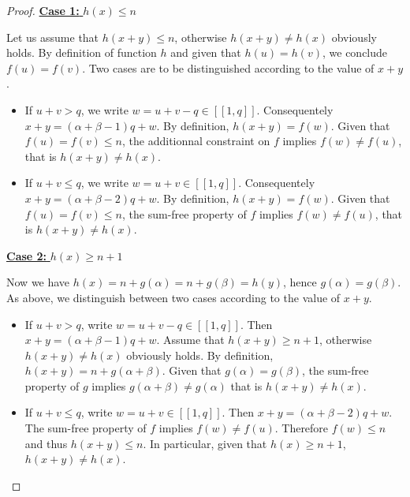 \documentclass[final,onefignum,onetabnum]{siamart190516}
\begin{document}
\begin{proof}
	\noindent \underline{\textbf{Case 1:} \(h(x) \leqslant n\)}
	\par
	Let us assume that \(h(x+y) \leqslant n\), otherwise \(h(x + y) \neq h(x)\) obviously holds. By definition of function 
	\(h\) and given that \(h(u) = h(v)\), we conclude \(f(u) = f(v)\). Two cases are to be distinguished according to the value of \(x + y\).
	
	\begin{itemize}
	\item If \(u + v > q\), we write \(w = u + v - q \in [\![1, q]\!]\). Consequentely \(x + y = (\alpha + \beta - 1) q + w\). By definition, 
		\(h(x + y) = f(w)\). Given that \(f(u) = f(v) \leqslant n\), the additionnal constraint on \(f\) implies \(f(w) 
		\neq f(u)\), that is \(h(x + y) \neq h(x)\).
	\item If \(u + v \leqslant q\), we write \(w = u + v \in [\![1, q]\!]\). Consequentely \(x+y = (\alpha + \beta- 2) q + w\). By definition, 
		\(h(x + y) = f(w)\). Given that \(f(u) = f(v) \leqslant n\), the sum-free property of \(f\) implies \(f(w) \neq f(u)\), 
		that is \(h(x + y) \neq h(x)\).
	\end{itemize} 
	  
	\noindent \underline{\textbf{Case 2:} \(h(x) \geqslant n + 1\)}
	\par
	Now we have \(h(x) = n + g(\alpha) = 
	n + g(\beta) = h(y)\), hence \(g(\alpha) = g(\beta)\). As above, we distinguish between two cases according 
	to the value of \(x + y\).
	
	\begin{itemize}
	\item \begin{sloppypar}
		If \(u + v > q\), write \(w = u + v - q \in [\![1, q]\!]\). Then \(x + y = (\alpha + \beta - 1) q + w\). Assume that 
		\({h(x+y) \geqslant n + 1}\),  otherwise \(h(x + y) \neq h(x)\) obviously holds. By definition, \({h(x + y) = n + g(\alpha + 
		\beta)}\). Given that \(g(\alpha) = g(\beta)\), the sum-free property of \(g\) implies \(g(\alpha + \beta) 
		\neq g(\alpha)\) that is \(h(x + y) \neq h(x)\).
		\end{sloppypar}
	\item  If \(u + v \leqslant q\), write \(w = u + v \in [\![1, q]\!]\). Then \(x+y = (\alpha + \beta- 2) q + w\). The sum-free 
		property of \(f\) implies \(f(w) \neq f(u)\). Therefore \(f(w) \leqslant n\) and thus \(h(x + y) \leqslant n\). In particular,
		given that \(h(x) \geqslant n + 1\), \(h(x + y) \neq h(x)\).
	\end{itemize}
\end{proof}
\end{document}
